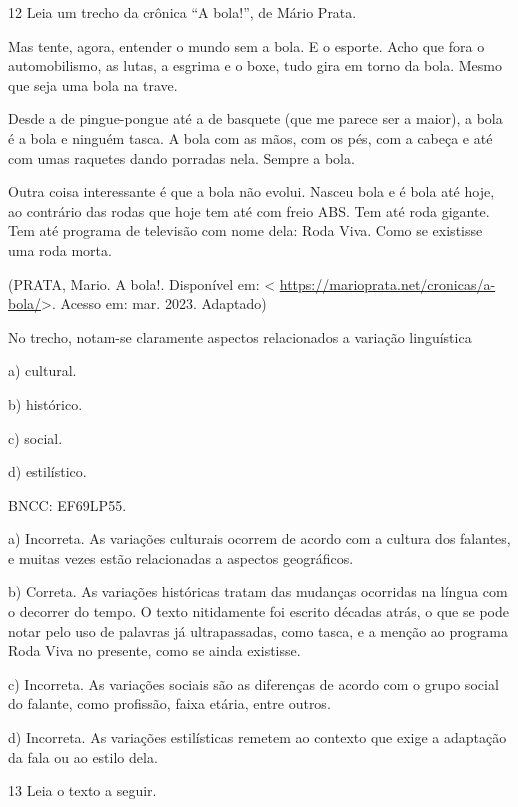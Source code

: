 {\num{12} Leia um trecho da crônica ``A bola!'', de Mário Prata.

Mas tente, agora, entender o mundo sem a bola. E o esporte. Acho que
fora o automobilismo, as lutas, a esgrima e o boxe, tudo gira em torno
da bola. Mesmo que seja uma bola na trave.

Desde a de pingue-pongue até a de basquete (que me parece ser a maior),
a bola é a bola e ninguém tasca. A bola com as mãos, com os pés, com a
cabeça e até com umas raquetes dando porradas nela. Sempre a bola.

Outra coisa interessante é que a bola não evolui. Nasceu bola e é bola
até hoje, ao contrário das rodas que hoje tem até com freio ABS. Tem até
roda gigante. Tem até programa de televisão com nome dela: Roda Viva.
Como se existisse uma roda morta.

(PRATA, Mario. A bola!. Disponível em: \textless{}
\url{https://marioprata.net/cronicas/a-bola/}\textgreater. Acesso em:
mar. 2023. Adaptado)

No trecho, notam-se claramente aspectos relacionados a variação
linguística

a) cultural.

b) histórico.

c) social.

d) estilístico.

BNCC: EF69LP55.

a) Incorreta. As variações culturais ocorrem de acordo com a cultura dos
falantes, e muitas vezes estão relacionadas a aspectos geográficos.

b) Correta. As variações históricas tratam das mudanças ocorridas na
língua com o decorrer do tempo. O texto nitidamente foi escrito décadas
atrás, o que se pode notar pelo uso de palavras já ultrapassadas, como
tasca, e a menção ao programa Roda Viva no presente, como se ainda
existisse.

c) Incorreta. As variações sociais são as diferenças de acordo com o
grupo social do falante, como profissão, faixa etária, entre outros.

d) Incorreta. As variações estilísticas remetem ao contexto que exige a
adaptação da fala ou ao estilo dela.

\num{13} Leia o texto a seguir.

}
